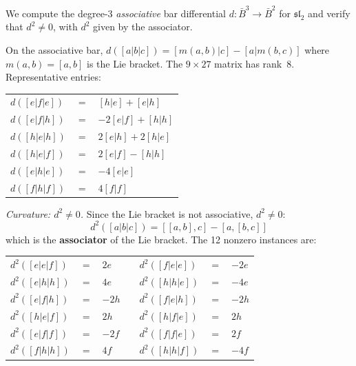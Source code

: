 \begin{computation}
\label{comp:sl2-bar-deg3-curvature}
\ClaimStatusProvedHere
{}

We compute the degree-3 \emph{associative} bar differential
$d\colon \bar{B}^3 \to \bar{B}^2$ for $\mathfrak{sl}_2$ and
verify that $d^2 \neq 0$, with $d^2$ given by the associator.

On the associative bar, $d([a|b|c]) = [m(a,b)|c] - [a|m(b,c)]$
where $m(a,b) = [a,b]$ is the Lie bracket.  The $9 \times 27$ matrix
has rank~$8$.  Representative entries:
\begin{center}
\renewcommand{\arraystretch}{1.2}
\begin{tabular}{lcl}
$d([e|f|e])$ & $=$ & $[h|e] + [e|h]$ \\
$d([e|f|h])$ & $=$ & $-2[e|f] + [h|h]$ \\
$d([h|e|h])$ & $=$ & $2[e|h] + 2[h|e]$ \\
$d([h|e|f])$ & $=$ & $2[e|f] - [h|h]$ \\
$d([e|h|e])$ & $=$ & $-4[e|e]$ \\
$d([f|h|f])$ & $=$ & $4[f|f]$
\end{tabular}
\end{center}

\emph{Curvature: $d^2 \neq 0$.}
Since the Lie bracket is not associative, $d^2 \neq 0$:
\begin{equation}\label{eq:sl2-assoc-bar-d2}
d^2([a|b|c]) = [[a,b],c] - [a,[b,c]]
\end{equation}
which is the \textbf{associator} of the Lie bracket.
The 12 nonzero instances are:
\begin{center}
\renewcommand{\arraystretch}{1.2}
\begin{tabular}{lclclcl}
$d^2([e|e|f])$ & $=$ & $2e$ &\qquad&
  $d^2([f|e|e])$ & $=$ & $-2e$ \\
$d^2([e|h|h])$ & $=$ & $4e$ &&
  $d^2([h|h|e])$ & $=$ & $-4e$ \\
$d^2([e|f|h])$ & $=$ & $-2h$ &&
  $d^2([f|e|h])$ & $=$ & $-2h$ \\
$d^2([h|e|f])$ & $=$ & $2h$ &&
  $d^2([h|f|e])$ & $=$ & $2h$ \\
$d^2([e|f|f])$ & $=$ & $-2f$ &&
  $d^2([f|f|e])$ & $=$ & $2f$ \\
$d^2([f|h|h])$ & $=$ & $4f$ &&
  $d^2([h|h|f])$ & $=$ & $-4f$
\end{tabular}
\end{center}


\end{computation}
